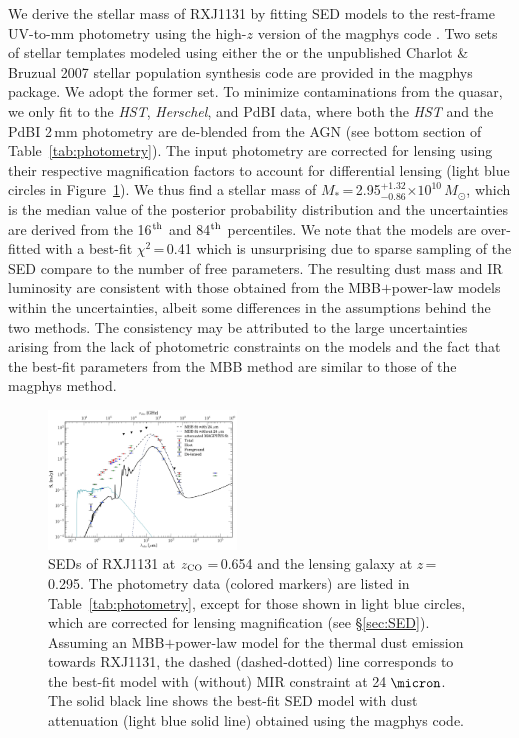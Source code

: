 \documentclass[]{emulateapj}
\newcommand{\Msun}{\mbox{$M_{\odot}$}\xspace}
\newcommand{\E}[1]{\mbox{$\times10^{#1}$}}
\newcommand{\petm}[2]{$^{+#1}_{-#2}$}
\newcommand{\eq}{\,=\,}
\newcommand{\Fig}[1]{Figure~\ref{fig:#1}}
\newcommand{\Tab}[1]{Table~\ref{tab:#1}}
\newcommand{\Sec}[1]{\S\ref{sec:#1}}
\newcommand{\ncode}[1]{{\sc #1}}
\begin{document}
We derive the stellar mass of RXJ1131 by
fitting SED models to the rest-frame UV-to-mm photometry
using the high-$z$ version of the {\sc magphys} code \citep{Magphys08a,Magphys15a}.
Two sets of stellar templates  modeled using either the \citet{BC03a} or the unpublished
Charlot \& Bruzual 2007 stellar population synthesis code
are provided in the {\sc magphys} package.
We adopt the former set.
To minimize contaminations from the quasar, we only fit to the {\it HST}, {\it Herschel}, and PdBI data,
where both the {\it HST} and the PdBI 2\,mm photometry are de-blended from the AGN
(see bottom section of \Tab{photometry}).
The input photometry are corrected for lensing using their respective magnification factors
to account for differential lensing (light blue circles in \Fig{SED}).
We thus find a stellar mass of $M_*$\eq2.95\petm{1.32}{0.86}\E{10}\,\Msun, which
is the median value of the posterior probability distribution and
the uncertainties are derived from the 16$^{\rm th}$ and 84$^{\rm th}$ percentiles.
We note that the models are over-fitted with a best-fit $\chi^2$\eq0.41
which is unsurprising due to sparse sampling of the SED
compare to the number of free parameters.
The resulting dust mass and IR luminosity are consistent with those obtained
from the MBB$+$power-law models within the uncertainties, albeit some differences
in the assumptions behind the two methods.
The consistency may be attributed to the large uncertainties arising from the lack of photometric constraints on the models and the fact that the best-fit parameters from the MBB method are similar to those of the \ncode{magphys} method.

\begin{figure}[!htbp]
\centering
\includegraphics[trim=5 5 5 5, clip, width=0.445\textwidth]{f10.pdf}
\caption{SEDs of RXJ1131 at
$z_{\rm CO}$\eq0.654 and the lensing galaxy at $z$\eq0.295.
The photometry data (colored markers) are listed in \Tab{photometry}, except for those
shown in light blue circles, which are corrected for lensing magnification (see \Sec{SED}).
Assuming an MBB$+$power-law model for the thermal dust emission towards RXJ1131,
the dashed (dashed-dotted) line corresponds to the best-fit model
with (without) MIR constraint at 24\,$\micron$.
The solid black line shows the best-fit SED model with dust attenuation (light blue solid line)
obtained using the \ncode{magphys} code.
\label{fig:SED}}
\end{figure}
\end{document}
